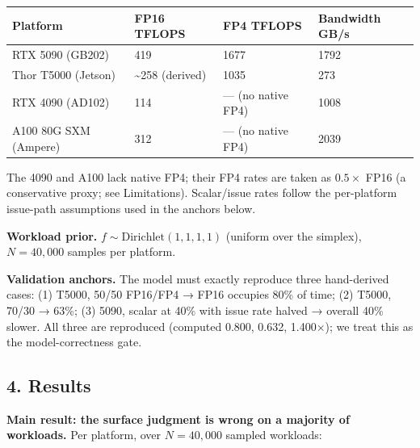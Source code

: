 {{
\begin{longtable}{@{}llll@{}}
\toprule\noalign{}
Platform & FP16 TFLOPS & FP4 TFLOPS & Bandwidth GB/s \\
\midrule\noalign{}
\endhead
\bottomrule\noalign{}
\endlastfoot
RTX 5090 (GB202) & 419 & 1677 & 1792 \\
Thor T5000 (Jetson) & \textasciitilde258 (derived) & 1035 & 273 \\
RTX 4090 (AD102) & 114 & --- (no native FP4) & 1008 \\
A100 80G SXM (Ampere) & 312 & --- (no native FP4) & 2039 \\
\end{longtable}
}

The 4090 and A100 lack native FP4; their FP4 rates are taken as \(0.5 \times\) FP16 (a conservative proxy; see Limitations). Scalar/issue rates follow the per-platform issue-path assumptions used in the anchors below.

\textbf{Workload prior.} \(f \sim \text{Dirichlet}(1,1,1,1)\) (uniform over the simplex), \(N = 40{,}000\) samples per platform.

\textbf{Validation anchors.} The model must exactly reproduce three hand-derived cases: (1) T5000, 50/50 FP16/FP4 → FP16 occupies 80\% of time; (2) T5000, 70/30 → 63\%; (3) 5090, scalar at 40\% with issue rate halved → overall 40\% slower. All three are reproduced (computed 0.800, 0.632, 1.400×); we treat this as the model-correctness gate.

\subsection{4. Results}\label{results}

\textbf{Main result: the surface judgment is wrong on a majority of workloads.} Per platform, over \(N=40{,}000\) sampled workloads:

}
